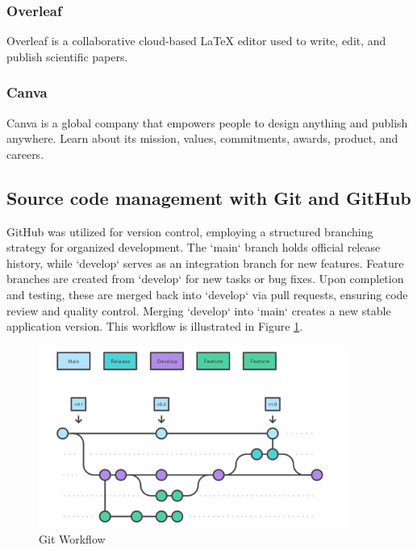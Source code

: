 \subsubsection*{\protect{} Overleaf}

Overleaf is a collaborative cloud-based LaTeX editor used to write, edit, and publish scientific papers.

\subsubsection*{\protect{} Canva}

Canva is a global company that empowers people to design anything and publish anywhere. Learn about its mission, values, commitments, awards, product, and careers.


\subsection{Source code management with Git and GitHub}
GitHub \cite{GithubWebsite} was utilized for version control, employing a structured branching strategy for organized development. The `main` branch holds official release history, while `develop` serves as an integration branch for new features. Feature branches are created from `develop` for new tasks or bug fixes. Upon completion and testing, these are merged back into `develop` via pull requests, ensuring code review and quality control. Merging `develop` into `main` creates a new stable application version. This workflow is illustrated in Figure \ref{fig:git-workflow}.

\begin{figure}[ht!]
    \centering
    \includegraphics[width=0.9\textwidth]{images/gitWorkflow.png}
    \caption{Git Workflow}
    \label{fig:git-workflow}
\end{figure}


